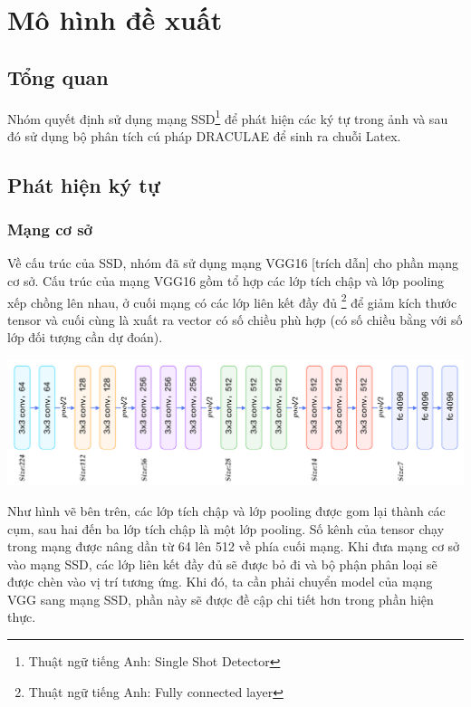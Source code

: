 \documentclass[a4paper,12pt]{article}
\begin{document}
	
	\newpage
	\section{Mô hình đề xuất}
	
	\subsection{Tổng quan}
	
	Nhóm quyết định sử dụng mạng SSD\footnote{Thuật ngữ tiếng Anh: Single Shot Detector} để phát hiện các ký tự trong ảnh và sau đó sử dụng bộ phân tích cú pháp DRACULAE để sinh ra chuỗi Latex.
	
	\subsection{Phát hiện ký tự}
	
	\subsubsection{Mạng cơ sở}
	
	Về cấu trúc của SSD, nhóm đã sử dụng mạng VGG16 [trích dẫn] cho phần mạng cơ sở. Cấu trúc của mạng VGG16 gồm tổ hợp các lớp tích chập và lớp pooling xếp chồng lên nhau, ở cuối mạng có các lớp liên kết đầy đủ \footnote{Thuật ngữ tiếng Anh: Fully connected layer} để giảm kích thước tensor và cuối cùng là xuất ra vector có số chiều phù hợp (có số chiều bằng với số lớp đối tượng cần dự đoán).
	
	\begin{center}
		
		\centering
		\includegraphics[width=0.8\linewidth]{vgg16.png}
		\vspace{0.5cm}
	\end{center}
	
	Như hình vẽ bên trên, các lớp tích chập và lớp pooling được gom lại thành các cụm, sau hai đến ba lớp tích chập là một lớp pooling. Số kênh của tensor chạy trong mạng được nâng dần từ 64 lên 512 về phía cuối mạng. Khi đưa mạng cơ sở vào mạng SSD, các lớp liên kết đầy đủ sẽ được bỏ đi và bộ phận phân loại sẽ được chèn vào vị trí tương ứng. Khi đó, ta cần phải chuyển model của mạng VGG sang mạng SSD, phần này sẽ được đề cập chi tiết hơn trong phần hiện thực.
	
\end{document}
